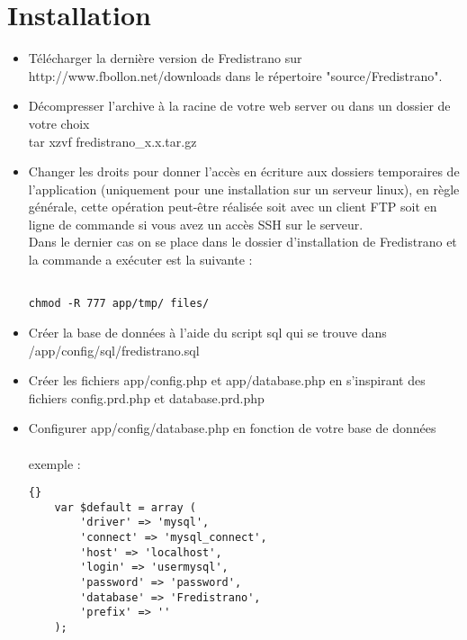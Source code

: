 \documentclass[12pt,a4paper]{report}
\begin{document}
\chapter{Installation}
\begin{itemize}
\item Télécharger la dernière version de Fredistrano sur http://www.fbollon.net/downloads dans le répertoire "source/Fredistrano".\\
\item Décompresser l'archive à la racine de votre web server ou dans un dossier de votre choix \: \\
tar xzvf fredistrano\_x.x.tar.gz \\
\item Changer les droits pour donner l'accès en écriture aux dossiers temporaires de l'application (uniquement pour une installation sur un serveur linux), en règle générale, cette opération peut-être réalisée soit avec un client FTP soit en ligne de commande si vous avez un accès SSH sur le serveur.\\
Dans le dernier cas on se place dans le dossier d'installation de Fredistrano et la commande a exécuter est la suivante :
\begin{verbatim}

chmod -R 777 app/tmp/ files/

\end{verbatim}

\item Créer la base de données à l'aide du script sql qui se trouve dans\\ /app/config/sql/fredistrano.sql\\
\item Créer les fichiers app/config.php et app/database.php en s'inspirant des fichiers config.prd.php et database.prd.php\newpage

\item Configurer app/config/database.php en fonction de votre base de données\\\\exemple :\\

\lstset{language=Php}
\lstset{commentstyle=\textit}

\begin{lstlisting}[frame=tb]{}
	var $default = array (
		'driver' => 'mysql',
		'connect' => 'mysql_connect',
		'host' => 'localhost',
		'login' => 'usermysql',
		'password' => 'password',
		'database' => 'Fredistrano',
		'prefix' => ''
	);
\end{lstlisting}



\end{itemize}
\end{document}
